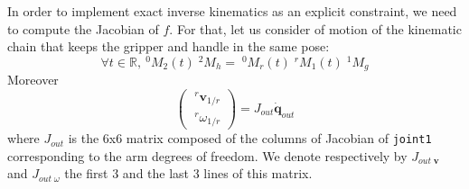\documentclass{article}
\newcommand\linvel{\mathbf{v}}
\newcommand\conf{\mathbf{q}}
\newcommand\reals{\mathbb{R}}
\begin{document}
In order to implement exact inverse kinematics as an explicit constraint, we need to compute the Jacobian of $f$. For that, let us consider of motion of the kinematic chain that keeps the gripper and handle in the same pose:
\begin{equation}\label{eq:jac1}
\forall t\in\reals,\ ^0M_2(t)\;^2M_h = \;^0M_r(t) \;^rM_1(t)\;^1M_g
\end{equation}
Moreover
\begin{equation}\label{eq:jacobian arm}
\left(\begin{array}{c}
  \;^r\linvel_{1/r} \\ \;^r\omega_{1/r}
\end{array}\right) =
J_{out} \dot{\conf}_{out}
\end{equation}
where $J_{out}$ is the 6x6 matrix composed of the columns of Jacobian of \texttt{joint1} corresponding to the arm degrees of freedom. We denote respectively by $J_{out\;\linvel}$ and $J_{out\;\omega}$ the first 3 and the last 3 lines of this matrix.
\end{document}

